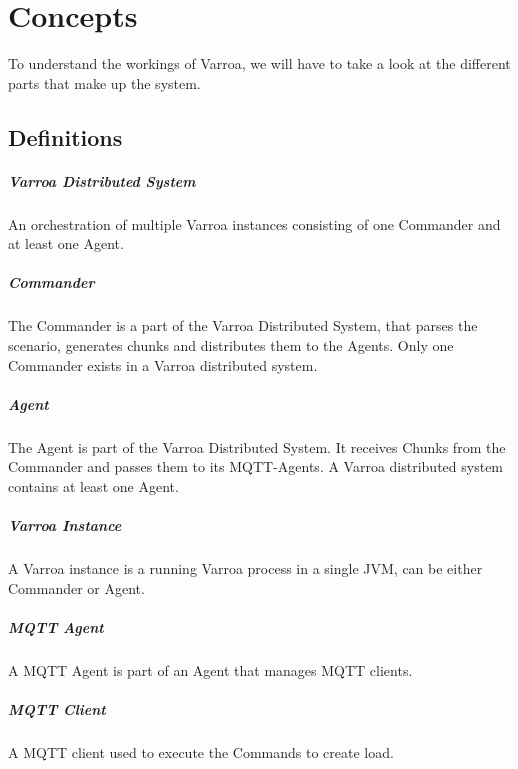 \chapter{Concepts}
To understand the workings of Varroa, we will have to take a look at the different parts that make up the system.


\section{Definitions}

\paragraph{Varroa Distributed System}
An orchestration of multiple Varroa instances consisting of one Commander and at least one Agent.

\paragraph{Commander}
The Commander is a part of the Varroa Distributed System, that parses the scenario, generates chunks and distributes them to the Agents.
Only one Commander exists in a Varroa distributed system.

\paragraph{Agent}
The Agent is part of the Varroa Distributed System.
It receives Chunks from the Commander and passes them to its MQTT-Agents.
A Varroa distributed system contains at least one Agent.

\paragraph{Varroa Instance}
A Varroa instance is a running Varroa process in a single JVM, can be either Commander or Agent.

\paragraph{MQTT Agent}
A MQTT Agent is part of an Agent that manages MQTT clients.


\paragraph{MQTT Client}
A MQTT client used to execute the Commands to create load.

